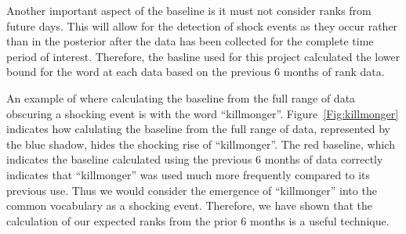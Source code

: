 \documentclass{article}
\begin{document}
Another important aspect of the baseline is it must not consider ranks from 
future days.
This will allow for the detection of shock events as they occur rather than
in the posterior after the data has been collected for the complete time period
of interest.
Therefore,
the basline used for this project calculated the lower bound for the word at
each data based on the previous 6 months of rank data.\par

An example of where calculating the baseline from the full range of data 
obscuring a shocking event is with the word ``killmonger''.
Figure~\ref{Fig:killmonger} indicates how calulating the baseline from the full
range of data,
represented by the blue shadow,
hides the shocking rise of ``killmonger''.  
The red baseline,
which indicates the baseline calculated using the previous 6 months of data
correctly indicates that ``killmonger'' was used much more frequently compared
to its previous use.
Thus we would consider the emergence of ``killmonger'' into the common
vocabulary as a shocking event.
Therefore,
we have shown that the calculation of our expected ranks from the prior
6 months is a useful technique.\par
\end{document}
